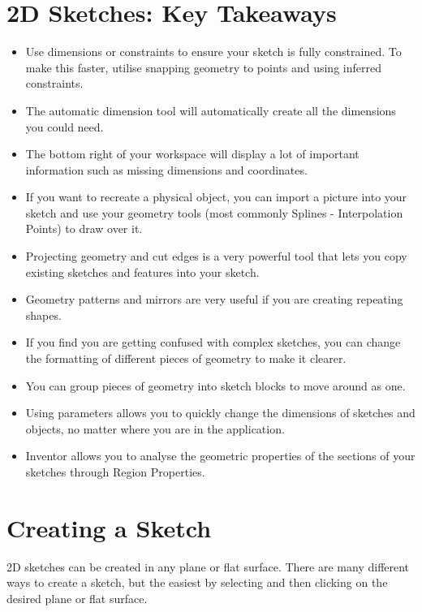\section{2D Sketches: Key Takeaways}
\begin{itemize}
\cbstart
{}
\item Use dimensions or constraints to ensure your sketch is fully constrained. To make this faster, utilise snapping geometry to points and using inferred constraints.
\item The automatic dimension tool will automatically create all the dimensions you could need.
\item The bottom right of your workspace will display a lot of important information such as missing dimensions and coordinates.
\item If you want to recreate a physical object, you can import a picture into your sketch and use your geometry tools (most commonly Splines - Interpolation Points) to draw over it.
\item Projecting geometry and cut edges is a very powerful tool that lets you copy existing sketches and features into your sketch.
\item Geometry patterns and mirrors are very useful if you are creating repeating shapes.
\item If you find you are getting confused with complex sketches, you can change the formatting of different pieces of geometry to make it clearer.
\item You can group pieces of geometry into sketch blocks to move around as one.
\item Using parameters allows you to quickly change the dimensions of sketches and objects, no matter where you are in the application.
\item Inventor allows you to analyse the geometric properties of the sections of your sketches through Region Properties.
\cbend
\end{itemize}

\section{Creating a Sketch}

\cbstart
{}

2D sketches can be created in any plane or flat surface. There are many different ways to create a sketch, but the easiest by selecting  and then clicking on the desired plane or flat surface.
\cbend
